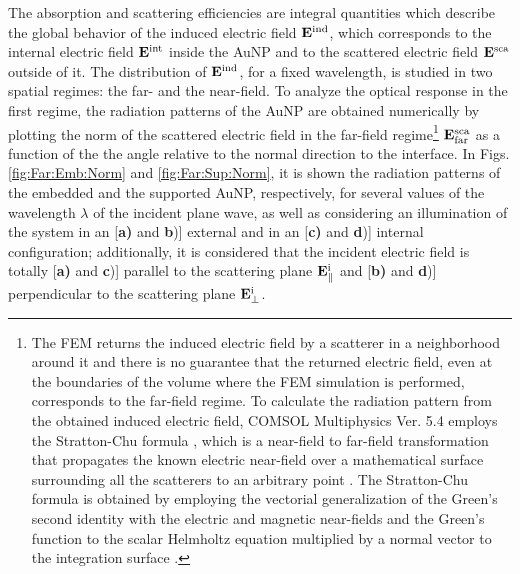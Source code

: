 The absorption and scattering efficiencies are integral quantities which describe the global behavior of the induced electric field $\vb{E}^\text{ind}$, which corresponds to the internal electric field $\vb{E}^\text{int}$ inside the AuNP and to the scattered electric field $\vb{E}^\text{sca}$ outside of it. The distribution of $\vb{E}^\text{ind}$, for a fixed wavelength, is studied in two spatial regimes: the far- and the near-field. To analyze the optical response in the first regime, the radiation patterns of the AuNP are obtained numerically by plotting the norm of the scattered electric field in the far-field regime\footnote{\label{fnote:Stratton:Chu}%
    The FEM returns the induced electric field by a scatterer in a neighborhood around it  and there is no guarantee that the returned electric field, even at the boundaries of the volume where the FEM simulation is performed, corresponds to the far-field regime.  To calculate the radiation pattern from the obtained induced electric field, COMSOL Multiphysics\texttrademark{} Ver. 5.4  employs the  Stratton-Chu formula \cite{comsol_wave}, which is a near-field to far-field  transformation that  propagates the known electric near-field  over a mathematical surface surrounding all the scatterers  to an arbitrary point \cite{anyutin_algorithm_2019}. The Stratton-Chu formula is obtained by employing the vectorial generalization of the Green's second identity with the electric and magnetic near-fields and the Green's function to the scalar Helmholtz equation multiplied by a normal vector to the integration surface \cite{stratton_diffraction_1939}.%
}%
 $\vb{E}^\text{sca}_\text{far}$ as a function of the the angle relative to the normal direction to the interface. In Figs. \ref{fig:Far:Emb:Norm} and  \ref{fig:Far:Sup:Norm}, it is shown the radiation patterns of the embedded and the supported AuNP, respectively, for several values of the wavelength $\lambda$ of the incident plane wave, as well as considering an illumination of the system in an  [\textbf{a)} and \textbf{b})] external and in an  [\textbf{c)} and \textbf{d})] internal configuration; additionally, it is considered that the incident electric field is totally [\textbf{a)} and \textbf{c})] parallel to the scattering plane $\vb{E}^\text{i}_\parallel$ and [\textbf{b)} and \textbf{d})] perpendicular to the scattering plane $\vb{E}^\text{i}_\perp$.

